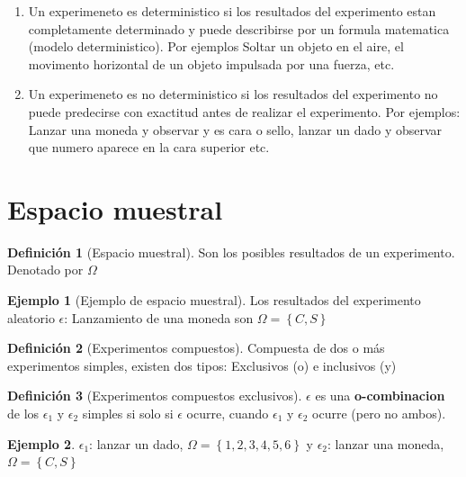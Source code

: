 \documentclass[
  11pt,
]{krantz}
\theoremstyle{definition}
\newtheorem{definition}{Definición}[chapter]
\theoremstyle{definition}
\newtheorem{example}{Ejemplo}[chapter]
\theoremstyle{definition}
\theoremstyle{definition}
\theoremstyle{remark}
\begin{document}
\begin{enumerate}
\def\labelenumi{\arabic{enumi}.}
\item
  Un experimeneto es deterministico si los resultados del experimento estan completamente determinado y puede describirse por un formula matematica (modelo deterministico). Por ejemplos Soltar un objeto en el aire, el movimento horizontal de un objeto impulsada por una fuerza, etc.
\item
  Un experimeneto es no deterministico si los resultados del experimento no puede predecirse con exactitud antes de realizar el experimento. Por ejemplos: Lanzar una moneda y observar y es cara o sello, lanzar un dado y observar que numero aparece en la cara superior etc.
\end{enumerate}

\hypertarget{espacio-muestral}{%
\section{Espacio muestral}\label{espacio-muestral}}

\begin{definition}[Espacio muestral]
Son los posibles resultados de un experimento. Denotado por \(\Omega\)
\end{definition}

\begin{example}[Ejemplo de espacio muestral]
Los resultados del experimento aleatorio \(\epsilon\): Lanzamiento de una moneda son \(\Omega=\left\{C,S\right\}\)
\end{example}

\begin{definition}[Experimentos compuestos]
Compuesta de dos o más experimentos simples, existen dos tipos: Exclusivos (o) e inclusivos (y)
\end{definition}

\begin{definition}[Experimentos compuestos exclusivos]
\(\epsilon\) es una \textbf{o-combinacion} de los \(\epsilon_1\) y \(\epsilon_2\) simples si solo si \(\epsilon\) ocurre, cuando \(\epsilon_1\) y \(\epsilon_2\) ocurre (pero no ambos).
\end{definition}

\begin{example}
\(\epsilon_1\): lanzar un dado, \(\Omega=\left\{1,2,3,4,5,6\right\}\) y \(\epsilon_2\): lanzar una moneda, \(\Omega=\left\{C,S\right\}\)
\end{example}
\end{document}
